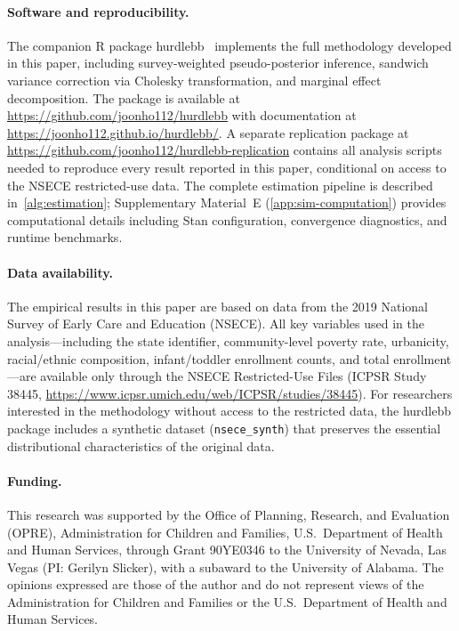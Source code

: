 \documentclass[12pt, reqno]{amsart}  %
\numberwithin{equation}{section}  %
\begin{document}
\bigskip

\paragraph{Software and reproducibility.}
The companion R package \textsf{hurdlebb}~\citep{hurdlebb2026} implements
the full methodology developed in this paper, including survey-weighted
pseudo-posterior inference, sandwich variance correction via Cholesky
transformation, and marginal effect decomposition.  The package is
available at \url{https://github.com/joonho112/hurdlebb} with
documentation at \url{https://joonho112.github.io/hurdlebb/}.  A
separate replication package at
\url{https://github.com/joonho112/hurdlebb-replication} contains all
analysis scripts needed to reproduce every result reported in this paper,
conditional on access to the NSECE restricted-use data.  The complete
estimation pipeline is described in~\cref{alg:estimation};
Supplementary Material~E (\cref{app:sim-computation}) provides
computational details including Stan configuration, convergence
diagnostics, and runtime benchmarks.

\paragraph{Data availability.}
The empirical results in this paper are based on data from the 2019
National Survey of Early Care and Education (NSECE). All key variables
used in the analysis---including the state identifier, community-level
poverty rate, urbanicity, racial/ethnic composition, infant/toddler
enrollment counts, and total enrollment---are available only through the
NSECE Restricted-Use Files (ICPSR Study 38445,
\url{https://www.icpsr.umich.edu/web/ICPSR/studies/38445}). For
researchers interested in the methodology without access to the restricted
data, the \textsf{hurdlebb} package includes a synthetic dataset
(\texttt{nsece\_synth}) that preserves the essential distributional
characteristics of the original data.

\paragraph{Funding.}
This research was supported by the Office of Planning, Research, and
Evaluation (OPRE), Administration for Children and Families, U.S.\
Department of Health and Human Services, through Grant 90YE0346 to the
University of Nevada, Las Vegas (PI: Gerilyn Slicker), with a subaward
to the University of Alabama. The opinions expressed are those of the
author and do not represent views of the Administration for Children and
Families or the U.S.\ Department of Health and Human Services.
\end{document}
